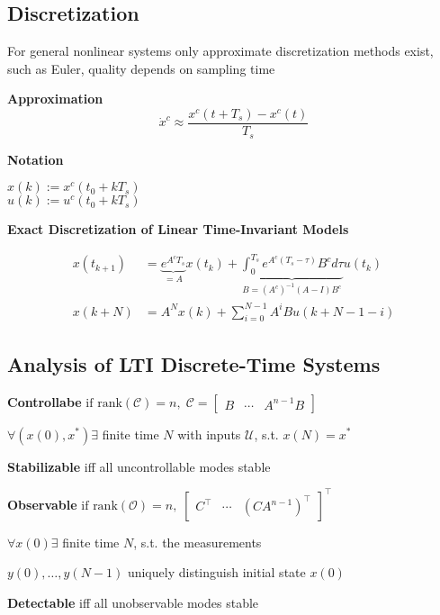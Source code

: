 \subsection{Discretization}

For general nonlinear systems only approximate discretization methods
exist, such as Euler, quality depends on sampling time

\begin{minipage}[t]{0.5\linewidth}
	\textbf{Approximation}\\
	\[
		\dot{x}^c \approx \frac{x^c(t + T_s)-x^c(t)}{T_s}
	\]
\end{minipage}
\begin{minipage}[t]{0.45\linewidth}
	\textbf{Notation}

	$x(k):= x^c(t_0+kT_s)$\\
	$u(k):= u^c(t_0+kT_s)$\\
\end{minipage}

\textbf{Exact Discretization of Linear Time-Invariant Models}

\begin{align*}
	x(t_{k+1}) & =
	\underbrace{e^{A^c T_s}}
	_{=A} x(t_k) +
	\underbrace{\textstyle\int_{0}^{T_s}
		e^{A^c(T_s - \tau)}B^c d\tau}
	_{B=(A^c)^{-1}(A-I)B^c} u(t_k)
	\\
	x(k+N)     & = A^N x(k) + \textstyle\sum_{i=0}^{N-1}
	A^i B u(k+N-1-i)
\end{align*}

\subsection{Analysis of LTI Discrete-Time Systems}

\textbf{Controllabe}
$
	\text{if rank}(\mathcal{C}) = n
	,\;
	\mathcal{C} =
	\begin{bmatrix}
		B & \cdots & A^{n-1} B
	\end{bmatrix}
$

$\forall(x(0),x^*)\exists$ finite time $N$
with inputs $\mathcal{U}$, s.t. $x(N)=x^*$

\textbf{Stabilizable} iff all uncontrollable modes stable

\textbf{Observable}
$
	\text{if rank}(\mathcal{O}) = n
	,\;
	\begin{bmatrix}
		C^\top & \cdots & (CA^{n-1})^\top
	\end{bmatrix}^\top
$

$\forall x(0)\exists$ finite time $N$, s.t. the measurements

$y(0), \dots, y(N-1)$
uniquely distinguish initial state $x(0)$

\textbf{Detectable} iff all unobservable modes stable

